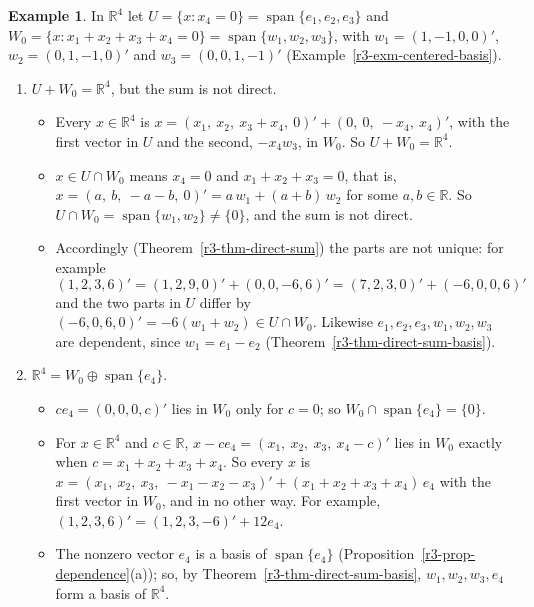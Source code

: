\documentclass[12pt]{article}
\newcommand{\R}{\mathbb R}
\DeclareMathOperator{\Span}{span}
\theoremstyle{definition}
\newtheorem{example}[theorem]{Example}
\begin{document}
\begin{example}\label{r3-exm-sum-r3}
In \(\R^4\) let \(U=\{x:x_4=0\}=\Span\{e_1,e_2,e_3\}\) and
\(W_0=\{x:x_1+x_2+x_3+x_4=0\}=\Span\{w_1,w_2,w_3\}\), with \(w_1=(1,-1,0,0)'\),
\(w_2=(0,1,-1,0)'\) and \(w_3=(0,0,1,-1)'\) (Example~\ref{r3-exm-centered-basis}).
\begin{enumerate}
\item \(U+W_0=\R^4\), but the sum is not direct.
\begin{itemize}
\item Every \(x\in\R^4\) is \(x=(x_1,\ x_2,\ x_3+x_4,\ 0)'+(0,\ 0,\ -x_4,\ x_4)'\), with the
first vector in \(U\) and the second, \(-x_4w_3\), in \(W_0\). So \(U+W_0=\R^4\).
\item \(x\in U\cap W_0\) means \(x_4=0\) and \(x_1+x_2+x_3=0\), that is,
\(x=(a,\ b,\ -a-b,\ 0)'=a\,w_1+(a+b)\,w_2\) for some \(a,b\in\R\). So
\(U\cap W_0=\Span\{w_1,w_2\}\ne\{0\}\), and the sum is not direct.
\item Accordingly (Theorem~\ref{r3-thm-direct-sum}) the parts are not unique: for example
\[
(1,2,3,6)'=(1,2,9,0)'+(0,0,-6,6)'=(7,2,3,0)'+(-6,0,0,6)'
\]
and the two parts in \(U\) differ by \((-6,0,6,0)'=-6(w_1+w_2)\in U\cap W_0\). Likewise
\(e_1,e_2,e_3,w_1,w_2,w_3\) are dependent, since \(w_1=e_1-e_2\)
(Theorem~\ref{r3-thm-direct-sum-basis}).
\end{itemize}
\item \(\R^4=W_0\oplus\Span\{e_4\}\).
\begin{itemize}
\item \(ce_4=(0,0,0,c)'\) lies in \(W_0\) only for \(c=0\); so \(W_0\cap\Span\{e_4\}=\{0\}\).
\item For \(x\in\R^4\) and \(c\in\R\), \(x-ce_4=(x_1,\ x_2,\ x_3,\ x_4-c)'\) lies in \(W_0\)
exactly when \(c=x_1+x_2+x_3+x_4\). So every \(x\) is
\(x=(x_1,\ x_2,\ x_3,\ -x_1-x_2-x_3)'+(x_1+x_2+x_3+x_4)\,e_4\) with the first vector in \(W_0\),
and in no other way. For example, \((1,2,3,6)'=(1,2,3,-6)'+12e_4\).
\item The nonzero vector \(e_4\) is a basis of \(\Span\{e_4\}\) (Proposition~\ref{r3-prop-dependence}(a)); so, by
Theorem~\ref{r3-thm-direct-sum-basis}, \(w_1,w_2,w_3,e_4\) form a basis of \(\R^4\).
\end{itemize}
\end{enumerate}
\end{example}
\end{document}
